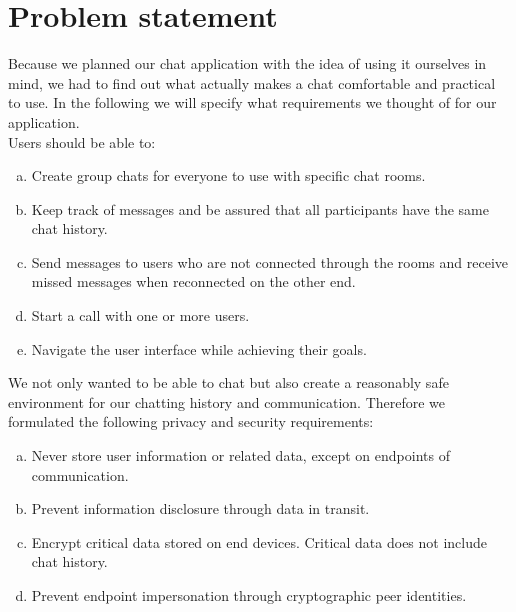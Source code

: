 \documentclass{article} %
\begin{document}
\section{Problem statement}
Because we planned our chat application with the idea of using it ourselves in mind, we had to find out what actually makes a chat comfortable and practical to use. In the following we will specify what requirements we thought of for our application. \\
Users should be able to:
\begin{enumerate} [a)]
    \item Create group chats for everyone to use with specific chat rooms.
    \item Keep track of messages and be assured that all participants have the same chat history.
    \item Send messages to users who are not connected through the rooms and receive missed messages when reconnected on the other end.
    \item Start a call with one or more users.
    \item Navigate the user interface while achieving their goals.

\end{enumerate}
 We not only wanted to be able to chat but also create a reasonably safe environment for our chatting history and communication. Therefore we formulated the following privacy and security requirements:
\begin{enumerate} [a)]
    \item Never store user information or related data, except on endpoints of communication.
    \item Prevent information disclosure through data in transit.
    \item Encrypt critical data stored on end devices. Critical data does not include chat history.
    \item Prevent endpoint impersonation through cryptographic peer identities.
\end{enumerate}
\end{document}
